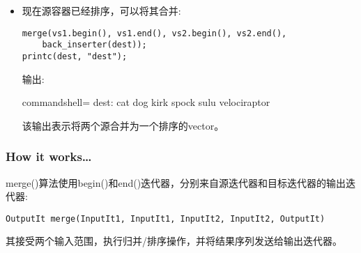 \begin{itemize}
\item 
现在源容器已经排序，可以将其合并:

\begin{lstlisting}[style=styleCXX]
merge(vs1.begin(), vs1.end(), vs2.begin(), vs2.end(),
	back_inserter(dest));
printc(dest, "dest");
\end{lstlisting}

输出:

\begin{tcblisting}{commandshell={}}
dest: cat dog kirk spock sulu velociraptor
\end{tcblisting}

该输出表示将两个源合并为一个排序的vector。
\end{itemize}

\subsubsection{How it works…}

merge()算法使用begin()和end()迭代器，分别来自源迭代器和目标迭代器的输出迭代器:

\begin{lstlisting}[style=styleCXX]
OutputIt merge(InputIt1, InputIt1, InputIt2, InputIt2, OutputIt)
\end{lstlisting}

其接受两个输入范围，执行归并/排序操作，并将结果序列发送给输出迭代器。

















